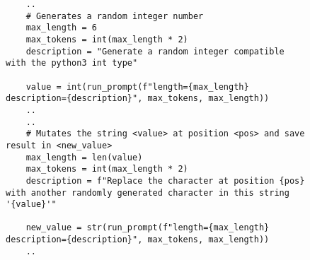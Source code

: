 
\begin{figure}[H]
    \centering
    \begin{verbatim}
    ..
    # Generates a random integer number
    max_length = 6
    max_tokens = int(max_length * 2)
    description = "Generate a random integer compatible with the python3 int type"

    value = int(run_prompt(f"length={max_length} description={description}", max_tokens, max_length))
    ..
    ..
    # Mutates the string <value> at position <pos> and save result in <new_value>
    max_length = len(value)
    max_tokens = int(max_length * 2)
    description = f"Replace the character at position {pos} with another randomly generated character in this string '{value}'"

    new_value = str(run_prompt(f"length={max_length} description={description}", max_tokens, max_length))
    ..
    \end{verbatim}
    \label{lis:code_prompt_mutate-gen}
\end{figure}